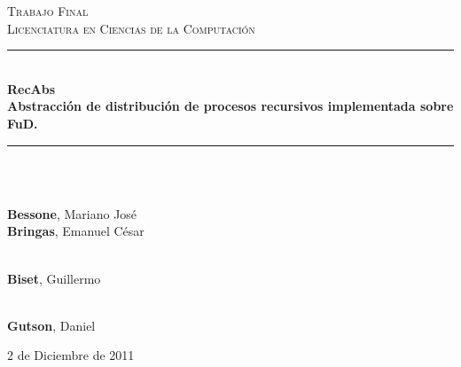 \documentclass[a4paper,12pt]{report}
\newcommand{\HRule}{\rule{\linewidth}{0.5mm}}
\begin{document}
\begin{titlepage}
\begin{center}
            \vspace{2cm}
            
            \textsc{\Large{Trabajo Final}}\\
            \textsc{Licenciatura en Ciencias de la Computación}\\
            
            \HRule\\[0.1cm]
            \textbf{\huge{RecAbs}\\[0.3cm]
                    \Large Abstracción de distribución de procesos recursivos implementada sobre FuD.}\\[0.1cm]
            \HRule\\[0.4cm]

            \vspace{1cm}

            \begin{large}
                \\
                \textbf{Bessone}, Mariano José\\
                \textbf{Bringas}, Emanuel César
            \end{large}            
                
            \vspace{1cm}
            
            \begin{minipage}{0.4\textwidth}
                \begin{center}
                     \\
                    \large{\textbf{Biset}, Guillermo}
                \end{center}
            \end{minipage}
            \begin{minipage}{0.4\textwidth}
                \begin{flushright} 
                 \\
                \large{\textbf{Gutson}, Daniel}
                \end{flushright}
            \end{minipage}

            \vfill
            {\large 2 de Diciembre de 2011}
            
        \end{center}

    \end{titlepage}
    
\end{document}

